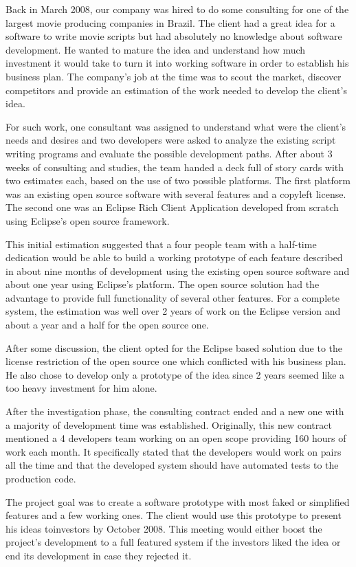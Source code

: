 \documentclass[lnbip]{svmultln}
\begin{document}
Back in March 2008, our company was hired to do some consulting for
one of the largest movie producing companies in Brazil. The client had
a great idea for a software to write movie scripts but had absolutely
no knowledge about software development.  He wanted to mature the idea
and understand how much investment it would take to turn it into
working software in order to establish his business plan. The
company's job at the time was to scout the market, discover
competitors and provide an estimation of the work needed to develop
the client's idea.

For such work, one consultant was assigned to understand what were the
client's needs and desires and two developers were asked to analyze
the existing script writing programs and evaluate the possible
development paths. After about 3 weeks of consulting and studies, the
team handed a deck full of story cards with two estimates each, based
on the use of two possible platforms. The first platform was an
existing open source software with several features and a copyleft
license. The second one was an Eclipse Rich Client Application
developed from scratch using Eclipse's open source framework.

This initial estimation suggested that a four people team with a
half-time dedication would be able to build a working prototype of
each feature described in about nine months of development using the
existing open source software and about one year using Eclipse's
platform. The open source solution had the advantage to provide full
functionality of several other features. For a complete system, the
estimation was well over 2 years of work on the Eclipse version and
about a year and a half for the open source one.

After some discussion, the client opted for the Eclipse based solution
due to the license restriction of the open source one which conflicted
with his business plan. He also chose to develop only a prototype of
the idea since 2 years seemed like a too heavy investment for him
alone.

After the investigation phase, the consulting contract ended and a new
one with a majority of development time was established. Originally,
this new contract mentioned a 4 developers team working on an open
scope providing 160 hours of work each month. It specifically stated
that the developers would work on pairs all the time and that the
developed system should have automated tests to the production code.

The project goal was to create a software prototype with most faked or
simplified features and a few working ones. The client would use this
prototype to present his ideas toinvestors by October 2008. This
meeting would either boost the project's development to a full
featured system if the investors liked the idea or end its development
in case they rejected it.
\end{document}
